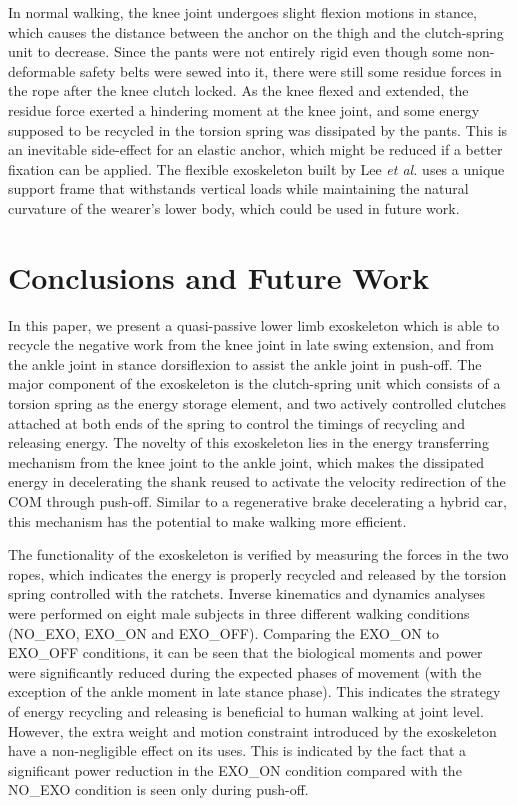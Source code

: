 \documentclass[10pt]{asme2ej}
\begin{document}
In normal walking, the knee joint undergoes slight flexion motions in stance, which causes the distance between the anchor on the thigh and the clutch-spring unit to decrease.
Since the pants were not entirely rigid even though some non-deformable safety belts were sewed into it, there were still some residue forces in the rope after the knee clutch locked.
As the knee flexed and extended, the residue force exerted a hindering moment at the knee joint, and some energy supposed to be recycled in the torsion spring was dissipated by the pants.
This is an inevitable side-effect for an elastic anchor, which might be reduced if a better fixation can be applied.
The flexible exoskeleton built by Lee \emph{et al.} \cite{exosuit} uses a unique support frame that withstands vertical loads while maintaining the natural curvature of the wearer's lower body, which could be used in future work.

\section{Conclusions and Future Work}
\label{sec:discussion}
In this paper, we present a quasi-passive lower limb exoskeleton which is able to recycle the negative work from the knee joint in late swing extension, and from the ankle joint in stance dorsiflexion to assist the ankle joint in push-off.
The major component of the exoskeleton is the clutch-spring unit which consists of a torsion spring as the energy storage element, and two actively controlled clutches attached at both ends of the spring to control the timings of recycling and releasing energy.
The novelty of this exoskeleton lies in the energy transferring mechanism from the knee joint to the ankle joint, which makes the dissipated energy in decelerating the shank reused to activate the velocity redirection of the COM through push-off.
Similar to a regenerative brake decelerating a hybrid car, this mechanism has the potential to make walking more efficient.

The functionality of the exoskeleton is verified by measuring the forces in the two ropes, which indicates the energy is properly recycled and released by the torsion spring controlled with the ratchets.
Inverse kinematics and dynamics analyses were performed on eight male subjects in three different walking conditions (NO\_EXO, EXO\_ON and EXO\_OFF).
Comparing the EXO\_ON to EXO\_OFF conditions, it can be seen that the biological moments and power were significantly reduced during the expected phases of movement (with the exception of the ankle moment in late stance phase).
This indicates the strategy of energy recycling and releasing is beneficial to human walking at joint level.
However, the extra weight and motion constraint introduced by the exoskeleton have a non-negligible effect on its uses.
This is indicated by the fact that a significant power reduction in the EXO\_ON condition compared with the NO\_EXO condition is seen only during push-off.
\end{document}
